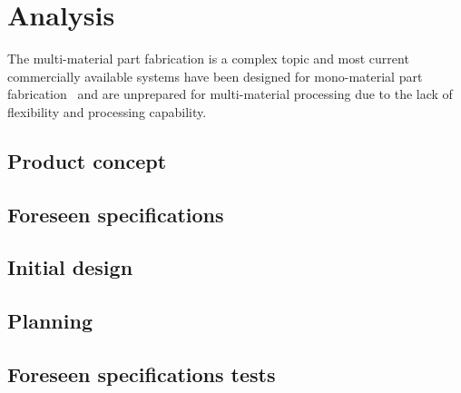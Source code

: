 \chapter{Analysis}%
\label{ch:analysis}
  The multi-material part fabrication is a complex topic and most current
  commercially available systems have been designed for mono-material part
  fabrication~\cite{wohlers2011wohlers} and are unprepared for multi-material
  processing due to the lack of flexibility and processing capability. 
%
\section{Product concept}%
\label{sec:product-concept}

%
\section{Foreseen specifications}%
\label{sec:fores-spec}

%
\section{Initial design}%
\label{sec:initial-design}

%
\section{Planning}%
\label{sec:planning}

%
\section{Foreseen specifications tests}%
\label{sec:planning}

%
